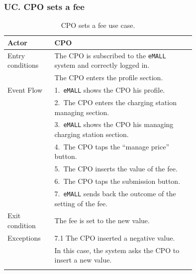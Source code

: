 \subsubsection*{UC\cuc . CPO sets a fee}
\begin{center}
    \begin{longtable}{lp{0.75\linewidth}}
        \hline
        Actor            & CPO                                                                       \\
        \hline
        Entry conditions & The CPO is subscribed to the \verb|eMALL| system and correctly logged in. \\
        & The CPO enters the profile section.                                       \\
        \hline
        Event Flow       & 1.\ \verb|eMALL| shows the CPO his profile.                               \\
        & 2.\ The CPO enters the charging station managing section.                 \\
        & 3.\ \verb|eMALL| shows the CPO his managing charging station section.     \\
        & 4.\ The CPO taps the ``manage price'' button.                             \\
        & 5.\ The CPO inserts the value of the fee.                                 \\
        & 6.\ The CPO taps the submission button.                                   \\
        & 7.\ \verb|eMALL| sends back the outcome of the setting of the fee.        \\
        \hline
        Exit condition   & The fee is set to the new value.                                          \\
        \hline
        Exceptions       & 7.1 The CPO inserted a negative value.                                    \\
        & In this case, the system asks the CPO to insert a new value.              \\
        \hline
        \caption{CPO sets a fee use case.}
        \label{tab: CPO_sets_fee_use_case}
    \end{longtable}


\end{center}
